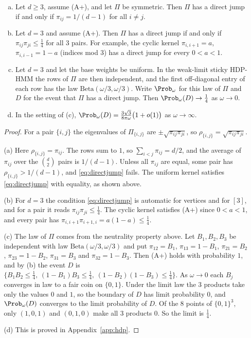 \begin{proposition}\label{prop:directjump}
\begin{enumerate}[(a)]
\item Let $d\ge3$, assume \textup{(A+)}, and let $\Pi$ be symmetric. Then
$\Pi$ has a direct jump if and only if $\pi_{ij}=1/(d-1)$ for all $i\ne j$.
\item Let $d=3$ and assume \textup{(A+)}. Then $\Pi$ has a direct jump if and
only if $\pi_{ij}\pi_{ji}\le\frac14$ for all $3$ pairs. For example, the
cyclic kernel $\pi_{i,i+1}=a$, $\pi_{i,i-1}=1-a$ (indices mod $3$) has a
direct jump for every $0<a<1$.
\item Let $d=3$ and let the base weights be uniform. In the weak-limit sticky
HDP-HMM the rows of $\Pi$ are then independent, and the first off-diagonal
entry of each row has the law $\mathrm{Beta}(\omega/3,\omega/3)$. Write
$\Prob_\omega$ for this law of $\Pi$ and $D$ for the event that $\Pi$ has a
direct jump. Then $\Prob_\omega(D)\to\frac14$ as $\omega\to0$.
\item In the setting of \textup{(c)},
$\Prob_\omega(D)=\frac{3\sqrt3}{8\pi\omega}\bigl(1+o(1)\bigr)$ as
$\omega\to\infty$.
\end{enumerate}
\end{proposition}

\begin{proof}
For a pair $\{i,j\}$ the eigenvalues of $\Pi_{\{i,j\}}$ are
$\pm\sqrt{\pi_{ij}\pi_{ji}}$, so $\rho_{\{i,j\}}=\sqrt{\pi_{ij}\pi_{ji}}$.

(a) Here $\rho_{\{i,j\}}=\pi_{ij}$. The rows sum to $1$, so
$\sum_{i<j}\pi_{ij}=d/2$, and the average of $\pi_{ij}$ over the $\binom d2$
pairs is $1/(d-1)$. Unless all $\pi_{ij}$ are equal, some pair has
$\rho_{\{i,j\}}>1/(d-1)$, and \eqref{eq:directjump} fails. The uniform kernel
satisfies \eqref{eq:directjump} with equality, as shown above.

(b) For $d=3$ the condition \eqref{eq:directjump} is automatic for vertices
and for $[3]$, and for a pair it reads $\pi_{ij}\pi_{ji}\le\frac14$. The
cyclic kernel satisfies (A+) since $0<a<1$, and every pair has
$\pi_{i,i+1}\pi_{i+1,i}=a(1-a)\le\frac14$.

(c) The law of $\Pi$ comes from the neutrality property above. Let
$B_1,B_2,B_3$ be independent with law $\mathrm{Beta}(\omega/3,\omega/3)$ and
put $\pi_{12}=B_1$, $\pi_{13}=1-B_1$, $\pi_{21}=B_2$, $\pi_{23}=1-B_2$,
$\pi_{31}=B_3$ and $\pi_{32}=1-B_3$. Then (A+) holds with probability $1$,
and by (b) the event $D$ is
$\{B_1B_2\le\frac14,\ (1-B_1)B_3\le\frac14,\ (1-B_2)(1-B_3)\le\frac14\}$. As
$\omega\to0$ each $B_j$ converges in law to a fair coin on $\{0,1\}$. Under
the limit law the 3 products take only the values $0$ and $1$, so the
boundary of $D$ has limit probability $0$, and $\Prob_\omega(D)$ converges
to the limit probability of $D$. Of the $8$ points of $\{0,1\}^3$, only
$(1,0,1)$ and $(0,1,0)$ make all 3 products $0$. So the limit is $\frac14$.

(d) This is proved in Appendix~\ref{app:hdp}.
\end{proof}

